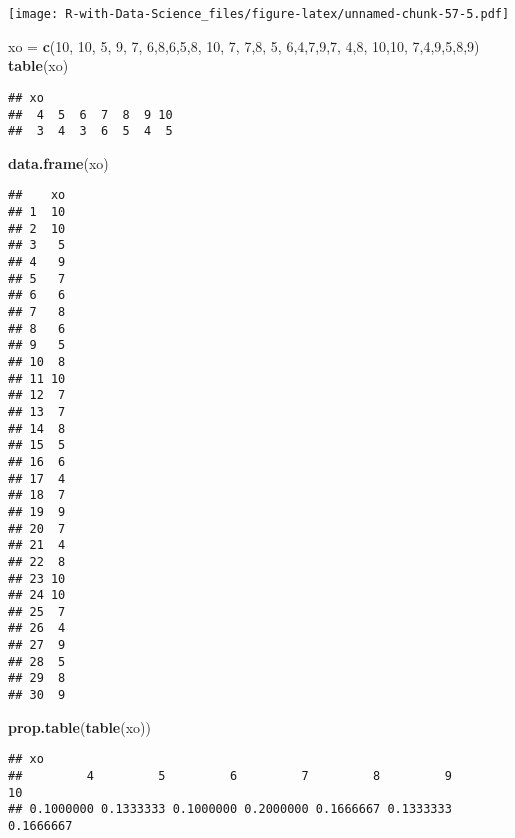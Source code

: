 \documentclass[
]{article}
\newenvironment{Shaded}{\begin{snugshade}}{\end{snugshade}}
\newcommand{\DecValTok}[1]{\textcolor[rgb]{0.00,0.00,0.81}{#1}}
\newcommand{\FunctionTok}[1]{\textcolor[rgb]{0.13,0.29,0.53}{\textbf{#1}}}
\newcommand{\NormalTok}[1]{#1}
\newcommand{\OtherTok}[1]{\textcolor[rgb]{0.56,0.35,0.01}{#1}}
\begin{document}
\texttt{[image: R-with-Data-Science\_files/figure-latex/unnamed-chunk-57-5.pdf]}

\begin{Shaded}
\begin{Highlighting}[]
\NormalTok{xo }\OtherTok{=} \FunctionTok{c}\NormalTok{(}\DecValTok{10}\NormalTok{, }\DecValTok{10}\NormalTok{, }\DecValTok{5}\NormalTok{, }\DecValTok{9}\NormalTok{, }\DecValTok{7}\NormalTok{, }\DecValTok{6}\NormalTok{,}\DecValTok{8}\NormalTok{,}\DecValTok{6}\NormalTok{,}\DecValTok{5}\NormalTok{,}\DecValTok{8}\NormalTok{, }\DecValTok{10}\NormalTok{, }\DecValTok{7}\NormalTok{, }\DecValTok{7}\NormalTok{,}\DecValTok{8}\NormalTok{, }\DecValTok{5}\NormalTok{, }\DecValTok{6}\NormalTok{,}\DecValTok{4}\NormalTok{,}\DecValTok{7}\NormalTok{,}\DecValTok{9}\NormalTok{,}\DecValTok{7}\NormalTok{, }\DecValTok{4}\NormalTok{,}\DecValTok{8}\NormalTok{, }\DecValTok{10}\NormalTok{,}\DecValTok{10}\NormalTok{, }\DecValTok{7}\NormalTok{,}\DecValTok{4}\NormalTok{,}\DecValTok{9}\NormalTok{,}\DecValTok{5}\NormalTok{,}\DecValTok{8}\NormalTok{,}\DecValTok{9}\NormalTok{)}
\FunctionTok{table}\NormalTok{(xo)}
\end{Highlighting}
\end{Shaded}

\begin{verbatim}
## xo
##  4  5  6  7  8  9 10 
##  3  4  3  6  5  4  5
\end{verbatim}

\begin{Shaded}
\begin{Highlighting}[]
\FunctionTok{data.frame}\NormalTok{(xo)}
\end{Highlighting}
\end{Shaded}

\begin{verbatim}
##    xo
## 1  10
## 2  10
## 3   5
## 4   9
## 5   7
## 6   6
## 7   8
## 8   6
## 9   5
## 10  8
## 11 10
## 12  7
## 13  7
## 14  8
## 15  5
## 16  6
## 17  4
## 18  7
## 19  9
## 20  7
## 21  4
## 22  8
## 23 10
## 24 10
## 25  7
## 26  4
## 27  9
## 28  5
## 29  8
## 30  9
\end{verbatim}

\begin{Shaded}
\begin{Highlighting}[]
\FunctionTok{prop.table}\NormalTok{(}\FunctionTok{table}\NormalTok{(xo))}
\end{Highlighting}
\end{Shaded}

\begin{verbatim}
## xo
##         4         5         6         7         8         9        10 
## 0.1000000 0.1333333 0.1000000 0.2000000 0.1666667 0.1333333 0.1666667
\end{verbatim}
\end{document}
